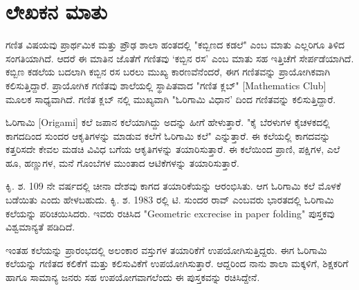 {
\makeatletter
\def\@makechapterhead#1{%
  \vspace*{5\p@}%
  {\parindent \z@ \raggedright \normalfont
    \ifnum \c@secnumdepth >\m@ne
      \if@mainmatter
        \LARGE\bfseries \@chapapp\space\thechapter
        \vskip 4pt
        \par\nobreak
        \vskip 5\p@
      \fi
    \fi
    \interlinepenalty\@M
    \LARGE\bfseries #1\par\nobreak
    \vskip 15\p@
  }}
  \makeatother




\chapter*{ಲೇಖಕನ ಮಾತು}

ಗಣಿತ  ವಿಷಯವು ಪ್ರಾರ್ಥಮಿಕ ಮತ್ತು ಪ್ರೌಢ ಶಾಲಾ ಹಂತದಲ್ಲಿ "ಕಬ್ಬಿಣದ ಕಡಲೆ" ಎಂಬ ಮಾತು ಎಲ್ಲರಿಗೂ ತಿಳಿದ ಸಂಗತಿಯಾಗಿದೆ. ಆದರೆ ಈ ಮಾತಿನ ಜೊತೆಗೆ  ಗಣಿತವು `ಕಬ್ಬಿನ ರಸ' ಎಂಬ ಮಾತು ಸಹ ಇತ್ತಿಚೆಗೆ ಸೇರ್ಪಡೆಯಾಗಿದೆ. ಕಬ್ಬಿಣ ಕಡಲೆಯ ಬದಲಾಗಿ ಕಬ್ಬಿನ ರಸ ಬರಲು ಮುಖ್ಯ ಕಾರಣವೆನೆಂದರೆ, ಈಗ ಗಣಿತವನ್ನು ಪ್ರಾಯೋಗಿಕವಾಗಿ ಕಲಿಸುತ್ತಿದ್ದಾರೆ. ಪ್ರಾಯೋಗಿಕ ಗಣಿತವು ಶಾಲೆಯಲ್ಲಿ ಸ್ಥಾಪಿತವಾದ "ಗಣಿತ ಕ್ಲಬ್" [Mathematics Club] ಮೂಲಕ ಸಾಧ್ಯವಾಗಿದೆ. ಗಣಿತ ಕ್ಲಬ್ ನಲ್ಲಿ ಮುಖ್ಯವಾಗಿ "ಓರಿಗಾಮಿ ವಿಧಾನ' ದಿಂದ ಗಣಿತವನ್ನು ಕಲಿಸುತ್ತಿದ್ದಾರೆ. 

\medskip

ಓರಿಗಾಮಿ [Origami] ಕಲೆ ಜಪಾನ ಕಲೆಯಾಗಿದ್ದು ಅದನ್ನು ಹೀಗೆ ಹೇಳುತ್ತಾರೆ. "ಕೈ ಬೆರಳುಗಳ ಕೈಚಳಕದಲ್ಲಿ ಕಾಗದದಿಂದ ಸುಂದರ ಆಕೃತಿಗಳನ್ನು ಮಾಡುವ ಕಲೆಗೆ ಓರಿಗಾಮಿ ಕಲೆ" ಎನ್ನುತ್ತಾರೆ. ಈ ಕಲೆಯಲ್ಲಿ ಕಾಗದವನ್ನು ಕತ್ತರಿಸದೇ ಕೇವಲ ಮಡಚಿ ವಿವಿಧ ಬಗೆಯ ಆಕೃತಿಗಳನ್ನು ತಯಾರಿಸುತ್ತಾರೆ. ಈ ಕಲೆಯಿಂದ ಪ್ರಾಣಿ, ಪಕ್ಷಿಗಳ, ಎಲೆ ಹೂ, ಹಣ್ಣುಗಳ, ಮನೆ ಗೊಂಬೆಗಳ ಮುಂತಾದ ಆಟಿಕೆಗಳನ್ನು ತಯಾರಿಸುತ್ತಾರೆ. 

\medskip

ಕಿೃ. ಶ. 109 ನೇ ವರ್ಷದಲ್ಲಿ ಚೀನಾ ದೇಶವು ಕಾಗದ ತಯಾರಿಕೆಯನ್ನು ಆರಂಭಿಸಿತು. ಆಗ ಓರಿಗಾಮಿ ಕಲೆ ಮೊಳಕೆ ಬಡೆಯಿತು ಎಂದು ಹೇಳಬಹುದು.  ಕಿೃ. ಶ. 1983 ರಲ್ಲಿ ಟಿ. ಸುಂದರ ರಾವ್ ಎಂಬವರು ಭಾರತದಲ್ಲಿ ಓರಿಗಾಮಿ ಕಲೆಯನ್ನು ಪರಿಚಯಿಸಿದರು. ಇವರು ರಚಿಸಿದ "Geometric excrecise in paper folding" ಪುಸ್ತಕವು ವಿಶ್ವಮಾನ್ಯತೆ ಪಡಿದಿದೆ. 

\medskip

ಇಂತಹ ಕಲೆಯನ್ನು ಪ್ರಾರಂಭದಲ್ಲಿ ಅಲಂಕಾರ ವಸ್ತುಗಳ ತಯಾರಿಕೆಗೆ ಉಪಯೋಗಿಸುತ್ತಿದ್ದರು. ಈಗ ಓರಿಗಾಮಿ ಕಲೆಯನ್ನು ಗಣಿತದ ಕಲಿಕೆಗೆ ಮತ್ತು ಕಲಿಸುವಿಕೆಗೆ ಉಪಯೋಗಿಸುತ್ತಾರೆ. ಆದ್ದರಿಂದ ನಾನು ಶಾಲಾ ಮಕ್ಕಳಿಗೆ, ಶಿಕ್ಷಕರಿಗೆ ಹಾಗೂ ಸಾಮಾನ್ಯ ಜನರು ಸಹ ಉಪಯೋಗವಾಗಲೆಂದು ಈ ಪುಸ್ತಕವನ್ನು ರಚಿಸಿದ್ದೇನೆ. 

}
